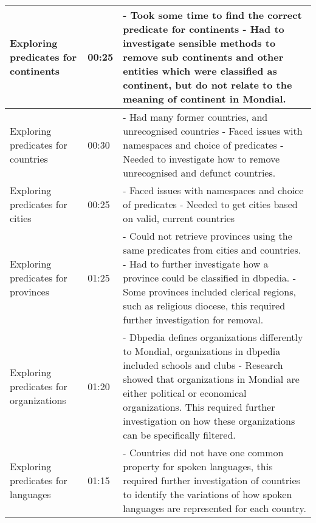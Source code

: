 \documentclass[11pt]{article}
\begin{document}
\begin{longtable}{|p{3.9cm}|p{4.05cm}|p{6.8cm}|}
    Exploring predicates for continents & 00:25 & 
        - Took some time to find the correct predicate for continents \newline
        - Had to investigate sensible methods to remove sub continents and other entities which
        were classified as continent, but do not relate to the meaning of continent in Mondial.
    \\
    \hline
    Exploring predicates for countries & 00:30 & 
        - Had many former countries, and unrecognised countries \newline
        - Faced issues with namespaces and choice of predicates \newline
        - Needed to investigate how to remove unrecognised and defunct countries.
    \\
    \hline
    Exploring predicates for cities & 00:25 & 
        - Faced issues with namespaces and choice of predicates \newline
        - Needed to get cities based on valid, current countries
    \\
    \hline
    Exploring predicates for provinces & 01:25 & 
        - Could not retrieve provinces using the same predicates from cities and countries.  \newline
        - Had to further investigate how a province could be classified in dbpedia. \newline
        - Some provinces included clerical regions, such as religious diocese, this required further investigation for removal.
    \\
    \hline
    Exploring predicates for organizations & 01:20 & 
        - Dbpedia defines organizations differently to Mondial, organizations in dbpedia included schools and clubs \newline
        - Research showed that organizations in Mondial are either political or economical organizations. This required
        further investigation on how these organizations can be specifically filtered.
    \\
    \hline
    Exploring predicates for languages & 01:15 & 
        - Countries did not have one common property for spoken languages, this required further investigation of countries to identify the
        variations of how spoken languages are represented for each country.
    \\
    \hline
\end{longtable}
\end{document}
